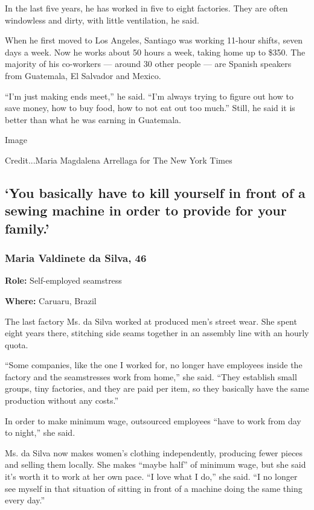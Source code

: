 In the last five years, he has worked in five to eight factories. They
are often windowless and dirty, with little ventilation, he said.

When he first moved to Los Angeles, Santiago was working 11-hour shifts,
seven days a week. Now he works about 50 hours a week, taking home up to
\$350. The majority of his co-workers --- around 30 other people --- are
Spanish speakers from Guatemala, El Salvador and Mexico.

``I'm just making ends meet,'' he said. ``I'm always trying to figure
out how to save money, how to buy food, how to not eat out too much.''
Still, he said it is better than what he was earning in Guatemala.

Image

Credit...Maria Magdalena Arrellaga for The New York Times

\hypertarget{you-basically-have-to-kill-yourself-in-front-of-a-sewing-machine-in-order-to-provide-for-your-family}{%
\subsection{`You basically have to kill yourself in front of a sewing
machine in order to provide for your
family.'}\label{you-basically-have-to-kill-yourself-in-front-of-a-sewing-machine-in-order-to-provide-for-your-family}}

\hypertarget{maria-valdinete-da-silva-46}{%
\subsubsection{Maria Valdinete da Silva,
46}\label{maria-valdinete-da-silva-46}}

\textbf{Role:} Self-employed seamstress

\textbf{Where:} Caruaru, Brazil

The last factory Ms. da Silva worked at produced men's street wear. She
spent eight years there, stitching side seams together in an assembly
line with an hourly quota.

``Some companies, like the one I worked for, no longer have employees
inside the factory and the seamstresses work from home,'' she said.
``They establish small groups, tiny factories, and they are paid per
item, so they basically have the same production without any costs.''

In order to make minimum wage, outsourced employees ``have to work from
day to night,'' she said.

Ms. da Silva now makes women's clothing independently, producing fewer
pieces and selling them locally. She makes ``maybe half'' of minimum
wage, but she said it's worth it to work at her own pace. ``I love what
I do,'' she said. ``I no longer see myself in that situation of sitting
in front of a machine doing the same thing every day.''

